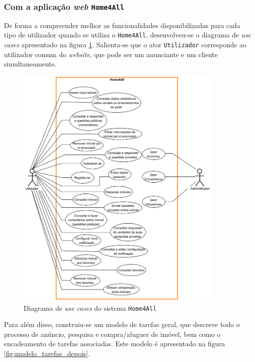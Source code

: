 \subsubsection{Com a aplicação \textit{web} \texttt{Home4All}}

De forma a compreender melhor as funcionalidades disponibilizadas para cada tipo de utilizador quando se utiliza o \texttt{Home4All}, desenvolveu-se o diagrama de \textit{use cases} apresentado na figura \ref{fig:use_cases}. Salienta-se que o ator \texttt{Utilizador} corresponde ao utilizador comum do \textit{website}, que pode ser um anunciante e um cliente simultaneamente.

\begin{figure}[H]
    \centering
    \includegraphics[width=0.9\textwidth]{./images/UseCases}
    \caption{Diagrama de \textit{use cases} do sistema \texttt{Home4All}}
    \label{fig:use_cases}
\end{figure}

Para além disso, construiu-se um modelo de tarefas geral, que descreve todo o processo de anúncio, pesquisa e compra/aluguer de imóvel, bem como o encadeamento de tarefas associadas. Este modelo é apresentado na figura \ref{fig:modelo_tarefas_depois}.

